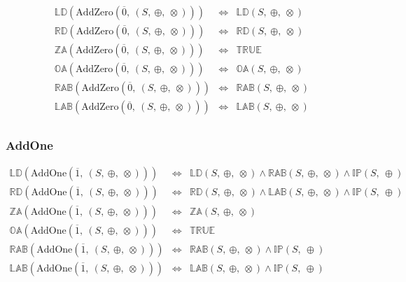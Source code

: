 \documentclass[10pt]{article}
\newcommand{\propname}[1]{{\mathbb{#1}}}
\begin{document}
\[
\begin{array}{rcl} 
\propname{LD}(\mathrm{AddZero}(\overline{0},\ (S,\ \oplus,\ \otimes))) 
    & \Leftrightarrow %
    & \propname{LD}(S,\ \oplus,\ \otimes) \\
\propname{RD}(\mathrm{AddZero}(\overline{0},\ (S,\ \oplus,\ \otimes))) 
    & \Leftrightarrow %
    & \propname{RD}(S,\ \oplus,\ \otimes) \\
\propname{ZA}(\mathrm{AddZero}(\overline{0},\ (S,\ \oplus,\ \otimes))) 
    & \Leftrightarrow %
    & \propname{TRUE}\\ 
\propname{OA}(\mathrm{AddZero}(\overline{0},\ (S,\ \oplus,\ \otimes))) 
    & \Leftrightarrow %
    & \propname{OA}(S,\ \oplus,\ \otimes) \\
\propname{RAB}(\mathrm{AddZero}(\overline{0},\ (S,\ \oplus,\ \otimes))) 
    & \Leftrightarrow %
    & \propname{RAB}(S,\ \oplus,\ \otimes)\\ 
\propname{LAB}(\mathrm{AddZero}(\overline{0},\ (S,\ \oplus,\ \otimes))) 
    & \Leftrightarrow %
    & \propname{LAB}(S,\ \oplus,\ \otimes)\\ 
\end{array} 
\] 

\subsubsection{AddOne} 


\[
\begin{array}{rcl} 
\propname{LD}(\mathrm{AddOne}(\overline{1},\ (S,\ \oplus,\ \otimes))) 
    & \Leftrightarrow %
    & \propname{LD}(S,\ \oplus,\ \otimes) 
      \wedge \propname{RAB}(S,\ \oplus,\ \otimes) 
      \wedge  \propname{IP}(S,\ \oplus) 
    \\
\propname{RD}(\mathrm{AddOne}(\overline{1},\ (S,\ \oplus,\ \otimes))) 
    & \Leftrightarrow %
    & \propname{RD}(S,\ \oplus,\ \otimes) 
      \wedge\propname{LAB}(S,\ \oplus,\ \otimes) 
      \wedge\propname{IP}(S,\ \oplus) 
    \\
\propname{ZA}(\mathrm{AddOne}(\overline{1},\ (S,\ \oplus,\ \otimes))) 
    & \Leftrightarrow %
    & \propname{ZA}(S,\ \oplus,\ \otimes) \\
\propname{OA}(\mathrm{AddOne}(\overline{1},\ (S,\ \oplus,\ \otimes))) 
    & \Leftrightarrow %
    & \propname{TRUE}\\ 
\propname{RAB}(\mathrm{AddOne}(\overline{1},\ (S,\ \oplus,\ \otimes))) 
    & \Leftrightarrow %
    & \propname{RAB}(S,\ \oplus,\ \otimes) 
      \wedge \propname{IP}(S,\ \oplus) \\ 
\propname{LAB}(\mathrm{AddOne}(\overline{1},\ (S,\ \oplus,\ \otimes))) 
    & \Leftrightarrow %
    & \propname{LAB}(S,\ \oplus,\ \otimes)
      \wedge \propname{IP}(S,\ \oplus) 
\\ 
\end{array} 
\] 
\end{document}
